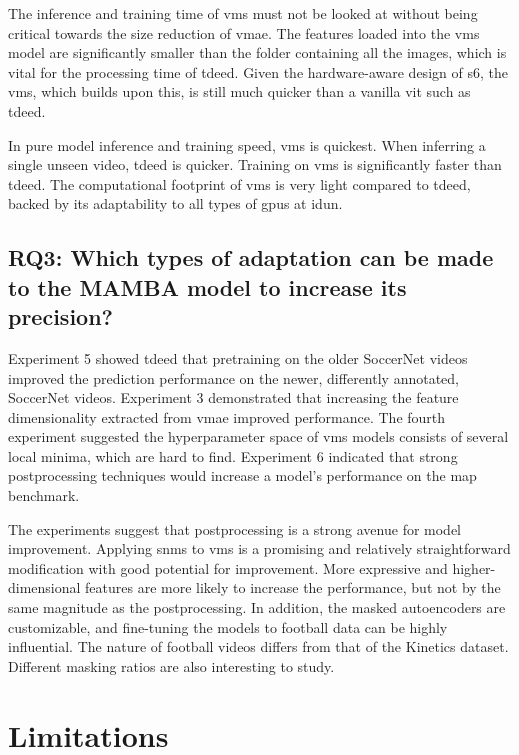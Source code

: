 The inference and training time of \acrshort{vms} must not be looked at without being critical towards the size reduction of \acrshort{vmae}. The features loaded into the \acrshort{vms} model are significantly smaller than the folder containing all the images, which is vital for the processing time of \acrshort{tdeed}. Given the hardware-aware design of \acrfull{s6}, the \acrshort{vms}, which builds upon this, is still much quicker than a vanilla \acrfull{vit} such as \acrshort{tdeed}.

In pure model inference and training speed, \acrshort{vms} is quickest. When inferring a single unseen video, \acrshort{tdeed} is quicker. Training on \acrshort{vms} is significantly faster than \acrshort{tdeed}. The computational footprint of \acrshort{vms} is very light compared to \acrshort{tdeed}, backed by its adaptability to all types of \acrshort{gpu}s at \acrshort{idun}. 


\subsection{RQ3: Which types of adaptation can be made to the MAMBA model to increase its precision?}

Experiment 5 showed \acrshort{tdeed} that pretraining on the older SoccerNet videos improved the prediction performance on the newer, differently annotated, SoccerNet videos. Experiment 3 demonstrated that increasing the feature dimensionality extracted from \acrshort{vmae} improved performance. The fourth experiment suggested the hyperparameter space of \acrshort{vms} models consists of several local minima, which are hard to find. Experiment 6 indicated that strong postprocessing techniques would increase a model's performance on the \acrshort{map} benchmark. 

The experiments suggest that postprocessing is a strong avenue for model improvement. Applying \acrfull{snms} to \acrshort{vms} is a promising and relatively straightforward modification with good potential for improvement. More expressive and higher-dimensional features are more likely to increase the performance, but not by the same magnitude as the postprocessing. In addition, the masked autoencoders are customizable, and fine-tuning the models to football data can be highly influential. The nature of football videos differs from that of the Kinetics dataset. Different masking ratios are also interesting to study. 

\section{Limitations}

